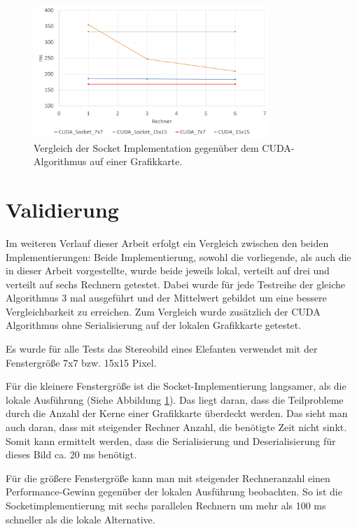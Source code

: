 \documentclass[conference]{IEEEtran}
\begin{document}
\begin{figure}[!t]
	\centering
	\includegraphics[width=3.5in]{SocketvsCUDA_bunt_3.pdf}
	\caption{Vergleich der Socket Implementation gegenüber dem CUDA-Algorithmus auf einer Grafikkarte.}
	\label{fig_socket_cuda}
\end{figure}

\section{Validierung}
Im weiteren Verlauf dieser Arbeit erfolgt ein Vergleich zwischen den beiden Implementierungen: 
Beide Implementierung, sowohl die vorliegende, als auch die in dieser Arbeit vorgestellte, wurde beide jeweils lokal, verteilt auf drei und verteilt auf sechs Rechnern getestet. Dabei wurde für jede Testreihe der gleiche Algorithmus 3 mal ausgeführt und der Mittelwert gebildet um eine bessere Vergleichbarkeit zu erreichen. Zum Vergleich wurde zusätzlich der CUDA Algorithmus ohne Serialisierung auf der lokalen Grafikkarte getestet. 

Es wurde für alle Tests das Stereobild eines Elefanten verwendet mit der Fenstergröße 7x7 bzw. 15x15 Pixel. 

Für die kleinere Fenstergröße ist die Socket-Implementierung langsamer, als die lokale Ausführung (Siehe Abbildung \ref{fig_socket_cuda}). Das liegt daran, dass die Teilprobleme durch die Anzahl der Kerne einer Grafikkarte überdeckt werden. Das sieht man auch daran, dass mit steigender Rechner Anzahl, die benötigte Zeit nicht sinkt. Somit kann ermittelt werden, dass die Serialisierung und Deserialisierung für dieses Bild ca. 20 ms benötigt.

Für die größere Fenstergröße kann man mit steigender Rechneranzahl einen Performance-Gewinn gegenüber der lokalen Ausführung beobachten. So ist die Socketimplementierung mit sechs parallelen Rechnern um mehr als 100 ms schneller als die lokale Alternative.
\end{document}
